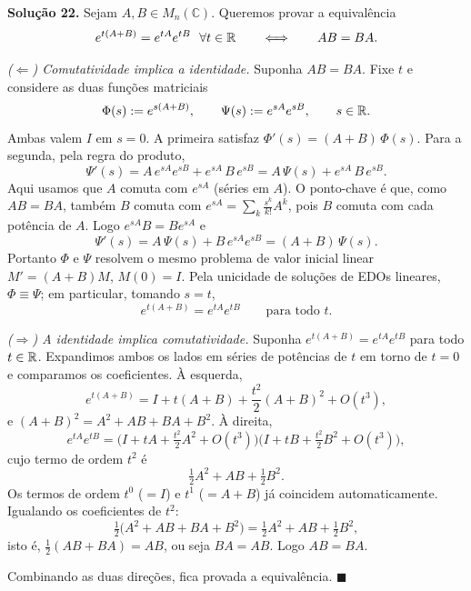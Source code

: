 \bigskip\noindent\textbf{Solução 22.}\quad
Sejam $A,B\in M_n(\mathbb{C})$. Queremos provar a equivalência
\[
    e^{t(A+B)}=e^{tA}e^{tB}\ \ \forall t\in\mathbb{R}
    \qquad\Longleftrightarrow\qquad
    AB=BA .
\]

\emph{($\Leftarrow$) Comutatividade implica a identidade.}
Suponha $AB=BA$. Fixe $t$ e considere as duas funções matriciais
\[
    \Phi(s):=e^{s(A+B)},\qquad \Psi(s):=e^{sA}e^{sB},\qquad s\in\mathbb{R} .
\]
Ambas valem $I$ em $s=0$. A primeira satisfaz $\Phi'(s)=(A+B)\,\Phi(s)$. Para a segunda, pela regra do produto,
\[
    \Psi'(s)=A\,e^{sA}e^{sB}+e^{sA}\,B\,e^{sB}
            =A\,\Psi(s)+e^{sA}\,B\,e^{sB}.
\]
Aqui usamos que $A$ comuta com $e^{sA}$ (séries em $A$). O ponto-chave é que, como $AB=BA$, também $B$ comuta com $e^{sA}=\sum_k \frac{s^k}{k!}A^k$, pois $B$ comuta com cada potência de $A$. Logo $e^{sA}B=Be^{sA}$ e
\[
    \Psi'(s)=A\,\Psi(s)+B\,e^{sA}e^{sB}=(A+B)\,\Psi(s).
\]
Portanto $\Phi$ e $\Psi$ resolvem o mesmo problema de valor inicial linear $M'=(A+B)M$, $M(0)=I$. Pela unicidade de soluções de EDOs lineares, $\Phi\equiv\Psi$; em particular, tomando $s=t$,
\[
    e^{t(A+B)}=e^{tA}e^{tB}\qquad\text{para todo }t.
\]

\emph{($\Rightarrow$) A identidade implica comutatividade.}
Suponha $e^{t(A+B)}=e^{tA}e^{tB}$ para todo $t\in\mathbb{R}$. Expandimos ambos os lados em séries de potências de $t$ em torno de $t=0$ e comparamos os coeficientes. À esquerda,
\[
    e^{t(A+B)}=I+t(A+B)+\frac{t^2}{2}(A+B)^2+O(t^3),
\]
e $(A+B)^2=A^2+AB+BA+B^2$. À direita,
\[
    e^{tA}e^{tB}
    =\Big(I+tA+\tfrac{t^2}{2}A^2+O(t^3)\Big)\Big(I+tB+\tfrac{t^2}{2}B^2+O(t^3)\Big),
\]
cujo termo de ordem $t^2$ é
\[
    \tfrac12 A^2+AB+\tfrac12 B^2 .
\]
Os termos de ordem $t^0$ ($=I$) e $t^1$ ($=A+B$) já coincidem automaticamente. Igualando os coeficientes de $t^2$:
\[
    \tfrac12\big(A^2+AB+BA+B^2\big)=\tfrac12 A^2+AB+\tfrac12 B^2 ,
\]
isto é, $\tfrac12(AB+BA)=AB$, ou seja $BA=AB$. Logo $AB=BA$.

Combinando as duas direções, fica provada a equivalência. \qquad$\blacksquare$



